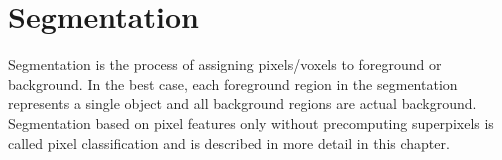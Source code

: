 \chapter{Segmentation}
\label{cha:segmentation}

Segmentation is the process of assigning pixels/voxels to foreground or background. In the best
case, each foreground region in the segmentation represents a single object and all background
regions are actual background. Segmentation based on pixel features only without precomputing
superpixels is called pixel classification and is described in more detail in this chapter.



